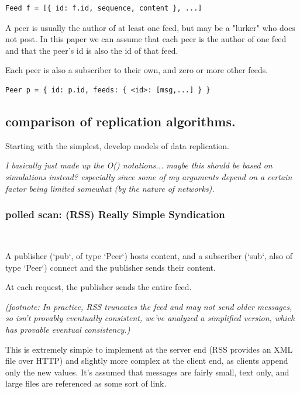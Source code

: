 \documentclass[sigconf]{acmart}
\begin{document}
\begin{verbatim}
Feed f = [{ id: f.id, sequence, content }, ...]
\end{verbatim}

A peer is usually the author of at least one feed, but may be a
"lurker" who does not post.  In this paper we can assume that each
peer is the author of one feed and that the peer's id is also the id
of that feed.

Each peer is also a subscriber to their own, and zero or more other feeds.

\begin{verbatim}
Peer p = { id: p.id, feeds: { <id>: [msg,...] } }
\end{verbatim}

\subsection{comparison of replication algorithms.}

Starting with the simplest, develop models of data replication.

{\em I basically just made up the O() notations... maybe this should
  be based on simulations instead?  especially since some of my
  arguments depend on a certain factor being limited somewhat (by the
  nature of networks).}

\subsubsection{polled scan: (RSS) Really Simple Syndication}\ \\ \vspace{-1em}

A publisher (`pub`, of type `Peer`) hosts content, and a subscriber
(`sub`, also of type `Peer`) connect and the publisher sends their
content.

At each request, the publisher sends the entire feed.

{\em (footnote: In practice, RSS truncates the feed and may not send
  older messages, so isn't provably eventually consistent, we've
  analyzed a simplified version, which has provable eventual
  consistency.)}

This is extremely simple to implement at the server end (RSS provides
an XML file over HTTP) and slightly more complex at the client end, as
clients append only the new values.  It's assumed that messages are
fairly small, text only, and large files are referenced as some sort
of link.
\end{document}
